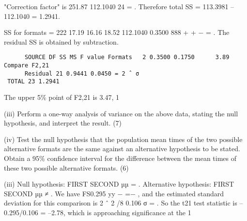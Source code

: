 \documentclass[a4paper,12pt]{article}
\begin{document}
"Correction factor" is 
251.87 112.1040 24 = . 
 Therefore total SS = 113.3981 – 112.1040 = 1.2941. 
 
SS for formats = 
222 17.19 16.16 18.52 112.1040 0.3500 888 + + − = . 
 The residual SS is obtained by subtraction. 
 \begin{verbatim}
      SOURCE DF SS MS F value Formats   2 0.3500 0.1750      3.89   Compare F2,21 
      Residual 21 0.9441 0.0450 = 2 ˆ σ
 TOTAL 23 1.2941   
 \end{verbatim}

 The upper 5\% point of F2,21 is 3.47, 1%
\newpage

\begin{framed}
(iii) Perform a one-way analysis of variance on the above data, stating the null hypothesis, and interpret the result. (7) 
 
(iv) Test the null hypothesis that the population mean times of the two possible alternative formats are the same against an alternative hypothesis to be stated.  Obtain a 95\% confidence interval for the difference between the mean times of these two possible alternative formats. (6) 

\end{framed}
(iii) Null hypothesis:  FIRST SECOND µµ = .  Alternative hypothesis:  FIRST SECOND µµ ≠ . 
 We have FS0.295 yy − =− , and the estimated standard deviation for this comparison is 2 ˆ 2 /8 0.106 σ = .  So the t21 test statistic is –0.295/0.106 = –2.78, which is approaching significance at the 1%
 
 
\end{document}
